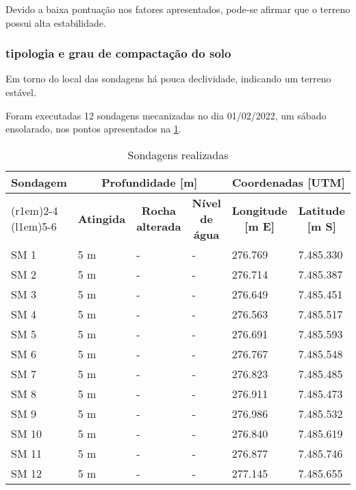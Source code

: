 \FloatBarrier

Devido a baixa pontuação nos fatores apresentados, pode-se afirmar que o terreno possui alta estabilidade.

\subsubsection{tipologia e grau de compactação do solo}

Em torno do local das sondagens há pouca declividade,
indicando um terreno estável.

Foram executadas 12 sondagens mecanizadas no dia
01/02/2022, um sábado ensolarado, nos pontos
apresentados na \cref{tab:sondspec}.

\begin{table}[htb!]
	\renewcommand{\multirowsetup}{\centering}
	\renewcommand\tabularxcolumn[1]{m{#1}}
	\centering
	\caption{Sondagens realizadas}
	\label{tab:sondspec}
	\begin{tabularx}{\textwidth}{l X X X X X}
		\toprule
		\multirow{3}{*}{\textbf{Sondagem}} & 
		\multicolumn{3}{c}{\textbf{Profundidade [m]}} &
		\multicolumn{2}{c}{\textbf{Coordenadas [UTM]}}\\
		\cmidrule(r{1em}){2-4}
		\cmidrule(l{1em}){5-6}
		&
		\multicolumn{1}{c}{\textbf{Atingida}} &
		\multicolumn{1}{c}{\textbf{Rocha alterada}} &
		\multicolumn{1}{c}{\textbf{Nível de água}} &
		\multicolumn{1}{c}{\textbf{Longitude [m E]}} &
		\multicolumn{1}{c}{\textbf{Latitude [m S]}} \\
		\midrule
SM  1 & 5 m & - & - & 276.769 & 7.485.330\\
SM  2 & 5 m & - & - & 276.714 & 7.485.387\\
SM  3 & 5 m & - & - & 276.649 & 7.485.451\\
SM  4 & 5 m & - & - & 276.563 & 7.485.517\\
SM  5 & 5 m & - & - & 276.691 & 7.485.593\\
SM  6 & 5 m & - & - & 276.767 & 7.485.548\\
SM  7 & 5 m & - & - & 276.823 & 7.485.485\\
SM  8 & 5 m & - & - & 276.911 & 7.485.473\\
SM  9 & 5 m & - & - & 276.986 & 7.485.532\\
SM 10 & 5 m & - & - & 276.840 & 7.485.619\\
SM 11 & 5 m & - & - & 276.877 & 7.485.746\\
SM 12 & 5 m & - & - & 277.145 & 7.485.655\\
		\bottomrule		
	\end{tabularx}
\end{table}

\FloatBarrier
